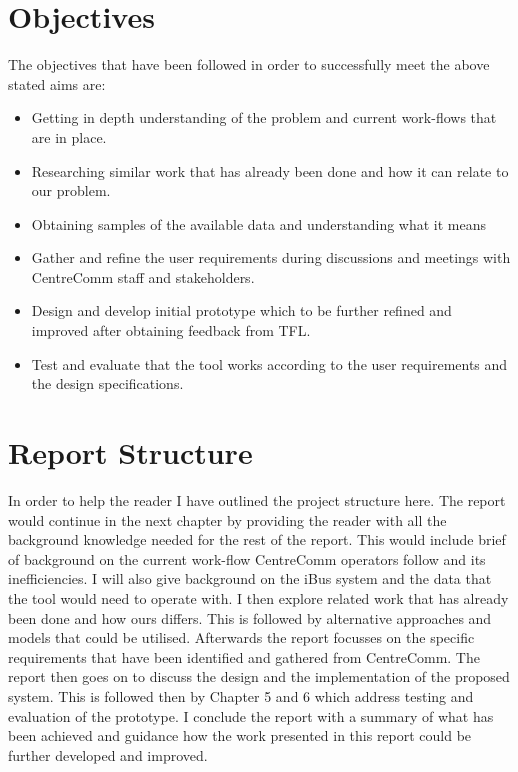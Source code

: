 \section{Objectives}
The objectives that have been followed in order to successfully meet the above stated aims are:
\begin{itemize}
	\item Getting in depth understanding of the problem and current work-flows that are in place.
	\item Researching similar work that has already been done and how it can relate to our problem.
	\item Obtaining samples of the available data and understanding what it means
	\item Gather and refine the user requirements during discussions and meetings with CentreComm staff and stakeholders.
	\item Design and develop initial prototype which to be further refined and improved after obtaining feedback from TFL.
	\item Test and evaluate that the tool works according to the user requirements and the design specifications.
\end{itemize}

\section{Report Structure}
In order to help the reader I have outlined the project structure here. The report would continue in the next chapter by providing the reader with all the background knowledge needed for the rest of the report. This would include brief of background on the current work-flow CentreComm operators follow and its inefficiencies. I will also give background on the iBus system and the data that the tool would need to operate with. I then explore related work that has already been done and how ours differs. This is followed by alternative approaches and models that could be utilised. Afterwards the report focusses on the specific requirements that have been identified and gathered from CentreComm. The report then goes on to discuss the design and the implementation of the proposed system. This is followed then by Chapter 5 and 6 which address testing and evaluation of the prototype. I conclude the report with a summary of what has been achieved and guidance how the work presented in this report could be further developed and improved.